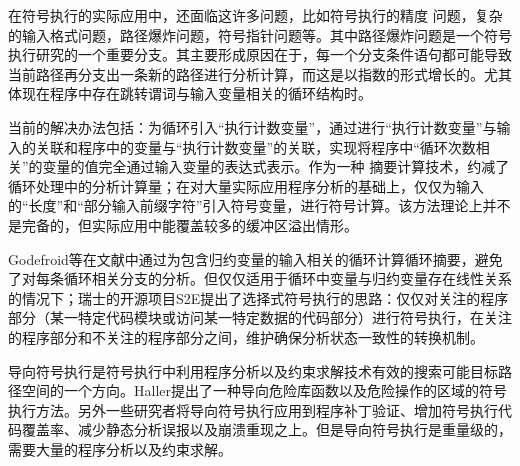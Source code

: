 在符号执行的实际应用中，还面临这许多问题，比如符号执行的精度
问题，复杂的输入格式问题，路径爆炸问题，符号指针问题等。其中路径爆炸问题是一个符号执行研究的一个重要分支。其主要形成原因在于，每一个分支条件语句都可能导致当前路径再分支出一条新的路径进行分析计算，而这是以指数的形式增长的。尤其体现在程序中存在跳转谓词与输入变量相关的循环结构时。

当前的解决办法包括：为循环引入“执行计数变量”，通过进行“执行计数变量”与输入的关联和程序中的变量与“执行计数变量”的关联，实现将程序中“循环次数相关”的变量的值完全通过输入变量的表达式表示。作为一种
摘要计算技术，约减了循环处理中的分析计算量；在对大量实际应用程序分析的基础上，仅仅为输入的“长度”和“部分输入前缀字符”引入符号变量，进行符号计算。该方法理论上并不是完备的，但实际应用中能覆盖较多的缓冲区溢出情形。

Godefroid等在文献中通过为包含归约变量的输入相关的循环计算循环摘要，避免了对每条循环相关分支的分析。但仅仅适用于循环中变量与归约变量存在线性关系的情况下；瑞士的开源项目S2E提出了选择式符号执行的思路：仅仅对关注的程序部分（某一特定代码模块或访问某一特定数据的代码部分）进行符号执行，在关注的程序部分和不关注的程序部分之间，维护确保分析状态一致性的转换机制。


导向符号执行是符号执行中利用程序分析以及约束求解技术有效的搜索可能目标路径空间的一个方向。Haller提出了一种导向危险库函数以及危险操作的区域的符号执行方法。另外一些研究者将导向符号执行应用到程序补丁验证、增加符号执行代码覆盖率、减少静态分析误报以及崩溃重现之上。但是导向符号执行是重量级的，需要大量的程序分析以及约束求解。

